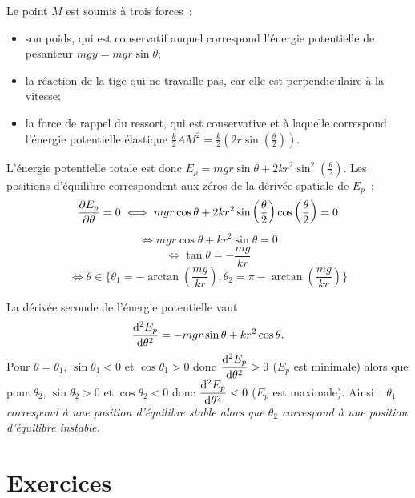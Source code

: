 Le point $M$ est soumis à trois forces~:
\begin{itemize}
\item son poids, qui est conservatif auquel correspond l'énergie potentielle de pesanteur $mgy=mgr\sin\theta$;
\item la réaction de la tige qui ne travaille pas, car elle est perpendiculaire à la vitesse;
\item la force de rappel du ressort, qui est conservative et à laquelle correspond l'énergie potentielle élastique $\frac{k}{2}AM^2=\frac{k}{2}\left(2r\sin\left(\frac{\theta}{2}\right)\right)$.
\end{itemize}

L'énergie potentielle totale est donc $E_p = mgr \sin\theta + 2kr^2 \sin^2\left(\frac{\theta}{2}\right)$. Les positions d'équilibre correspondent aux zéros de la dérivée spatiale de $E_p$~:
\begin{equation}
  \dfrac{\partial E_p}{\partial \theta} = 0 \iff mgr\cos\theta +2kr^2 \sin\left(\frac{\theta}{2}\right) \cos\left(\frac{\theta}{2}\right)=0
\end{equation}
\begin{equation}
\iff mgr\cos\theta + kr^2 \sin\theta=0
\end{equation}
\begin{equation}
\iff \tan\theta = -\frac{mg}{kr}
\end{equation}
\begin{equation}
\iff \theta \in \{\theta_1=-\arctan \left( \frac{mg}{kr} \right), \theta_2=\pi-\arctan \left( \frac{mg}{kr} \right)\}
\end{equation}

La dérivée seconde de l'énergie potentielle vaut
\begin{equation}
  \dfrac{\mathrm{d}^2 E_p}{\mathrm{d} {\theta}^2} = -mgr\sin\theta +kr^2\cos\theta.
\end{equation}
Pour $\theta=\theta_1$, $\sin\theta_1<0$ et $\cos\theta_1>0$ donc $\dfrac{\mathrm{d}^2 E_p}{\mathrm{d} {\theta}^2}>0$ ($E_p$ est minimale) alors que pour $\theta_2$, $\sin\theta_2>0$ et $\cos\theta_2<0$ donc $\dfrac{\mathrm{d}^2 E_p}{\mathrm{d} {\theta}^2}<0$ ($E_p$ est maximale). Ainsi~: \emph{$\theta_1$ correspond à une position d'équilibre stable alors que $\theta_2$ correspond à une position d'équilibre instable.}

\section{Exercices}
\label{chap4-sec:exercices}

